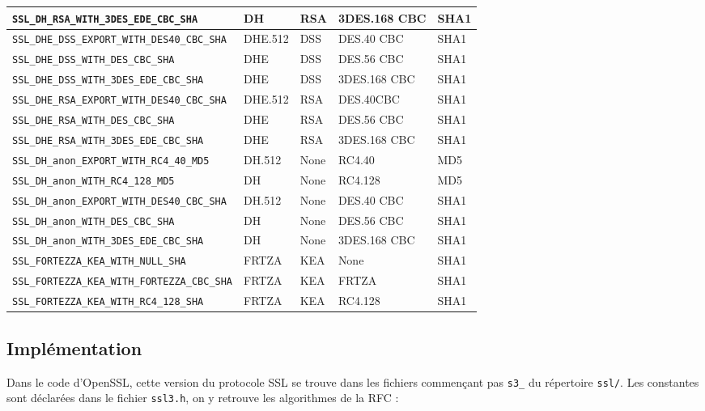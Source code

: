 \documentclass[a4paper,11pt,french]{article}
\begin{document}
\begin{center}
\begin{tabularx}{17cm}{|l|l|l|X|l|}
\hline
\verb+SSL_DH_RSA_WITH_3DES_EDE_CBC_SHA+ & DH&RSA&3DES.168 CBC&SHA1\\
\hline
\verb+SSL_DHE_DSS_EXPORT_WITH_DES40_CBC_SHA+ & DHE.512&DSS&DES.40 CBC&SHA1\\
\hline
\verb+SSL_DHE_DSS_WITH_DES_CBC_SHA+ & DHE&DSS&DES.56 CBC&SHA1\\
\hline
\verb+SSL_DHE_DSS_WITH_3DES_EDE_CBC_SHA+ & DHE&DSS&3DES.168 CBC&SHA1\\
\hline
\verb+SSL_DHE_RSA_EXPORT_WITH_DES40_CBC_SHA+ & DHE.512&RSA&DES.40CBC&SHA1\\
\hline
\verb+SSL_DHE_RSA_WITH_DES_CBC_SHA+ & DHE&RSA&DES.56 CBC&SHA1\\
\hline
\verb+SSL_DHE_RSA_WITH_3DES_EDE_CBC_SHA+ & DHE&RSA&3DES.168 CBC&SHA1\\
\hline 
\verb+SSL_DH_anon_EXPORT_WITH_RC4_40_MD5+ & DH.512&None&RC4.40&MD5\\
\hline
\verb+SSL_DH_anon_WITH_RC4_128_MD5+ & DH&None&RC4.128&MD5\\
\hline
\verb+SSL_DH_anon_EXPORT_WITH_DES40_CBC_SHA+ & DH.512&None&DES.40 CBC&SHA1\\
\hline
\verb+SSL_DH_anon_WITH_DES_CBC_SHA+& DH	&None	&DES.56	CBC&SHA1\\
\hline
\verb+SSL_DH_anon_WITH_3DES_EDE_CBC_SHA+ & DH	&None	&3DES.168 CBC&	SHA1\\
\hline
\verb+SSL_FORTEZZA_KEA_WITH_NULL_SHA+ & FRTZA&	KEA&	None&	SHA1\\
\hline
\verb+SSL_FORTEZZA_KEA_WITH_FORTEZZA_CBC_SHA+ & FRTZA & KEA & FRTZA& SHA1\\
\hline
\verb+SSL_FORTEZZA_KEA_WITH_RC4_128_SHA+ & FRTZA	&KEA&	RC4.128	&SHA1\\
\hline
\end{tabularx}
\end{center}


\subsection{Implémentation}

Dans le code d'OpenSSL, cette version du protocole SSL se trouve dans les fichiers commençant pas \verb+s3_+ du répertoire \verb+ssl/+. Les constantes sont déclarées dans le fichier \verb+ssl3.h+, on y retrouve les algorithmes de la RFC :
\end{document}

